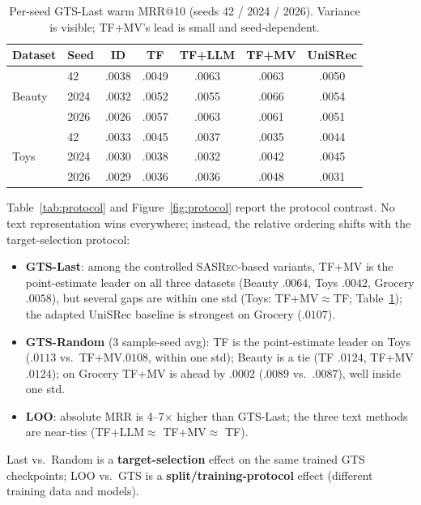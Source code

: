\documentclass[sigconf,natbib=true,anonymous]{acmart}
\newcommand{\tfllm}{\textsc{TF+LLM}\xspace}
\newcommand{\tfmv}{\textsc{TF+MV}\xspace}
\newcommand{\base}{\textsc{SASRec}\xspace}
\begin{document}
\begin{table}[t]
\centering
\caption{%
Per-seed GTS-Last warm MRR@10 (seeds 42 / 2024 / 2026).
Variance is visible; \tfmv's lead is small and seed-dependent.%
}
\label{tab:perseed}
\small
\setlength{\tabcolsep}{3pt}
\begin{tabular}{@{}llccccc@{}}
\toprule
Dataset & Seed & ID & TF & TF+LLM & TF+MV & UniSRec \\
\midrule
\multirow{3}{*}{Beauty}
 & 42    & .0038 & .0049 & .0063 & .0063 & .0050 \\
 & 2024  & .0032 & .0052 & .0055 & .0066 & .0054 \\
 & 2026  & .0026 & .0057 & .0063 & .0061 & .0051 \\
\midrule
\multirow{3}{*}{Toys}
 & 42    & .0033 & .0045 & .0037 & .0035 & .0044 \\
 & 2024  & .0030 & .0038 & .0032 & .0042 & .0045 \\
 & 2026  & .0029 & .0036 & .0036 & .0048 & .0031 \\
\bottomrule
\end{tabular}
\end{table}

Table~\ref{tab:protocol} and Figure~\ref{fig:protocol} report the protocol contrast.
No text representation wins everywhere; instead, the relative ordering shifts with the target-selection protocol:

\begin{itemize}[leftmargin=*,itemsep=1pt]
\item \textbf{GTS-Last}: among the controlled \base-based variants, \tfmv is the point-estimate leader on all three datasets (Beauty $.0064$, Toys $.0042$, Grocery $.0058$), but several gaps are within one std (Toys: \tfmv$\approx$TF; Table~\ref{tab:perseed}); the adapted UniSRec baseline is strongest on Grocery ($.0107$).
\item \textbf{GTS-Random} (3 sample-seed avg): TF is the point-estimate leader on Toys ($.0113$ vs.\ \tfmv $.0108$, within one std); Beauty is a tie (TF $.0124$, \tfmv $.0124$); on Grocery \tfmv is ahead by $.0002$ ($.0089$ vs.\ $.0087$), well inside one std.
\item \textbf{LOO}: absolute MRR is 4--7$\times$ higher than GTS-Last; the three text methods are near-ties (\tfllm $\approx$ \tfmv $\approx$ TF).
\end{itemize}
Last vs.\ Random is a \textbf{target-selection} effect on the same trained GTS checkpoints; LOO vs.\ GTS is a \textbf{split/training-protocol} effect (different training data and models).
\end{document}
